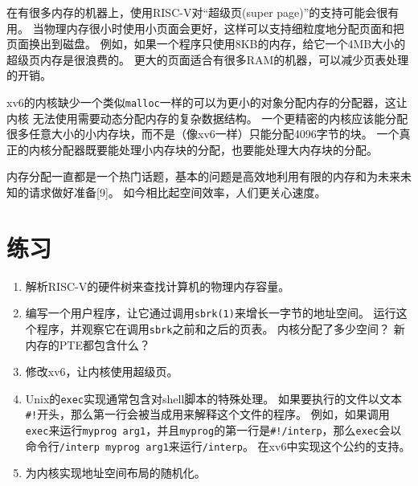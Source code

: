 在有很多内存的机器上，使用RISC-V对“超级页(super page)”的支持可能会很有用。
当物理内存很小时使用小页面会更好，这样可以支持细粒度地分配页面和把页面换出到磁盘。
例如，如果一个程序只使用8KB的内存，给它一个4MB大小的超级页内存是很浪费的。
更大的页面适合有很多RAM的机器，可以减少页表处理的开销。

xv6的内核缺少一个类似\texttt{malloc}一样的可以为更小的对象分配内存的分配器，这让内核
无法使用需要动态分配内存的复杂数据结构。
一个更精密的内核应该能分配很多任意大小的小内存块，而不是（像xv6一样）只能分配4096字节的块。
一个真正的内核分配器既要能处理小内存块的分配，也要能处理大内存块的分配。

内存分配一直都是一个热门话题，基本的问题是高效地利用有限的内存和为未来未知的请求做好准备[9]。
如今相比起空间效率，人们更关心速度。

\section{练习}
\begin{enumerate}
    \item 解析RISC-V的硬件树来查找计算机的物理内存容量。
    \item 编写一个用户程序，让它通过调用\texttt{sbrk(1)}来增长一字节的地址空间。
    运行这个程序，并观察它在调用\texttt{sbrk}之前和之后的页表。
    内核分配了多少空间？
    新内存的PTE都包含什么？
    \item 修改xv6，让内核使用超级页。
    \item Unix的\texttt{exec}实现通常包含对shell脚本的特殊处理。
    如果要执行的文件以文本\texttt{\#!}开头，那么第一行会被当成用来解释这个文件的程序。
    例如，如果调用\texttt{exec}来运行\texttt{myprog arg1}，并且\texttt{myprog}的第一行是\texttt{\#!/interp}，那么\texttt{exec}会以命令行\texttt{/interp myprog arg1}来运行\texttt{/interp}。
    在xv6中实现这个公约的支持。
    \item 为内核实现地址空间布局的随机化。
\end{enumerate}
